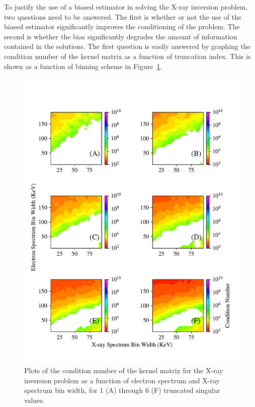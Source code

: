To justify the use of a biased estimator in solving the X-ray inversion problem, two questions need to be answered. The first is whether or not the use of the biased estimator significantly improves the conditioning of the problem. The second is whether the bias significantly degrades the amount of information contained in the solutions. The first question is easily answered by graphing the condition number of the kernel matrix as a function of truncation index. This is shown as a function of binning scheme in Figure~\ref{condition-number-binning-tsvd}.  

\begin{figure}[p]
    \centering
    \includegraphics[width=.95\textwidth]{figures/chapter_4/condition_number_binning_tsvd/condition_number_binning_tsvd.pdf}
    \caption{Plots of the condition number of the kernel matrix for the X-ray inversion problem as a function of electron spectrum and X-ray spectrum bin width, for 1 (A) through 6 (F) truncated singular values.}
    \label{condition-number-binning-tsvd}
\end{figure}

